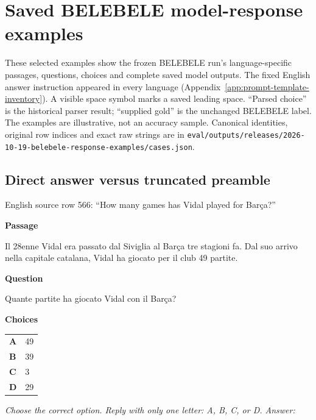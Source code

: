 \section{Saved BELEBELE model-response examples}
\label{app:belebele-model-responses}
These selected examples show the frozen BELEBELE run's language-specific passages, questions, choices and complete saved model outputs. The fixed English answer instruction appeared in every language (Appendix~\ref{app:prompt-template-inventory}). A visible space symbol marks a saved leading space. ``Parsed choice'' is the historical parser result; ``supplied gold'' is the unchanged BELEBELE label. The examples are illustrative, not an accuracy sample. Canonical identities, original row indices and exact raw strings are in \nolinkurl{eval/outputs/releases/2026-10-19-belebele-response-examples/cases.json}.

\subsection*{Direct answer versus truncated preamble}

English source row 566: ``How many games has Vidal played for Barça?''

\begin{tcolorbox}[enhanced,colback=black!2,colframe=black!25,boxrule=0.4pt,arc=1pt,left=7pt,right=6pt,top=5pt,bottom=5pt,title={Italian item, saved row 566},fonttitle=\sffamily\small,coltitle=black,colbacktitle=black!8,before upper={\raggedright\setlength{\parindent}{0pt}}]
\textbf{Passage}\par\smallskip Il 28enne Vidal era passato dal Siviglia al Barça tre stagioni fa. Dal suo arrivo nella capitale catalana, Vidal ha giocato per il club 49 partite.
\par\medskip\textbf{Question}\par\smallskip Quante partite ha giocato Vidal con il Barça?
\par\medskip\textbf{Choices}\par\smallskip
\begin{tabularx}{\linewidth}{@{}lX@{}}
\textbf{A} & 49\\
\textbf{B} & 39\\
\textbf{C} & 3\\
\textbf{D} & 29\\
\end{tabularx}
\par\smallskip\emph{Choose the correct option. Reply with only one letter: A, B, C, or D. Answer:}
\end{tcolorbox}

